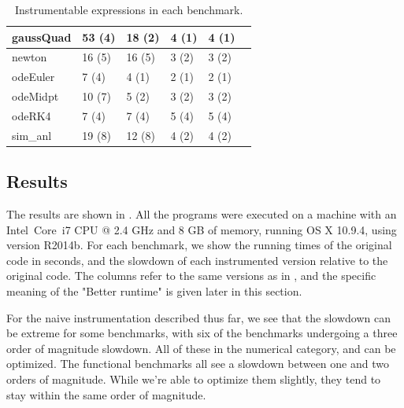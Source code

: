 \begin{table}
\begin{tabular}{| l | l | l | l | l | l |}
  gaussQuad   & 53 (4) & 18 (2) & 4 (1) & 4 (1) \\ \hline
  newton      & 16 (5) & 16 (5) & 3 (2) & 3 (2) \\ \hline
  odeEuler    & 7 (4) & 4 (1) & 2 (1) & 2 (1) \\\hline
  odeMidpt    & 10 (7) & 5 (2) & 3 (2) & 3 (2) \\ \hline
  odeRK4      & 7 (4) & 7 (4) & 5 (4) & 5 (4) \\ \hline
  sim\_anl    & 19 (8) & 12 (8) & 4 (2) & 4 (2) \\ \hline
\end{tabular}
\caption{Instrumentable expressions in each benchmark.}
\label{tab:InstrumentationBenchmarksInstrumentable}
\end{table}

\subsection{Results}

The results are shown in . All the
programs were executed on a machine with an Intel\textregistered \,
Core\texttrademark \, i7 CPU @ 2.4 GHz and 8 GB of memory, running OS X 10.9.4,
using \matlab version R2014b. For each benchmark, we show the running times of
the original code in seconds, and the slowdown of each instrumented version
relative to the original code. The columns refer to the same versions as in
, and the specific
meaning of the "Better runtime" is given later in this section.

For the naive instrumentation described thus far, we see that the slowdown can
be extreme for some benchmarks, with six of the benchmarks undergoing a three
order of magnitude slowdown. All of these in the numerical category, and can be
optimized. The functional benchmarks all see a slowdown between one and two
orders of magnitude. While we're able to optimize them slightly, they tend to
stay within the same order of magnitude.

